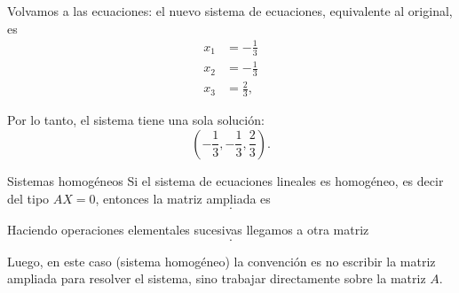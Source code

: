 \documentclass[handout]{beamer} %
\renewcommand{\_}[1]{_{\left[ #1 \right]}}
\renewcommand{\^}[1]{^{\left[ #1 \right]}}
\begin{document}
 	\begin{frame}
 		Volvamos a las ecuaciones: el nuevo sistema de ecuaciones, equivalente al original, es
 		\begin{align*}
 		x_1  &= -\frac{1}{3} \\
 		x_2  &=-\frac{1}{3} \\
 		x_3 &= \frac{2}{3}, 
 		\end{align*}
 		
 		Por lo tanto, el sistema tiene una sola solución:
 		$$
 		( -\frac{1}{3}, -\frac{1}{3} ,\frac{2}{3}).
 		$$

 	\end{frame}
 	

\begin{frame}{Sistemas homogéneos}
 Si el sistema de ecuaciones lineales  es homogéneo, es decir del tipo $AX=0$, entonces la matriz ampliada es 
 \begin{equation*}
 	[A|0].
 \end{equation*}
 
 Haciendo operaciones elementales sucesivas llegamos a otra matriz  
  \begin{equation*}
 [B|0].
 \end{equation*}
 
 Luego,  en este caso (sistema homogéneo) la convención es no escribir la matriz ampliada para resolver el sistema, sino trabajar directamente sobre la matriz $A$. 
 
 
\end{frame}
\end{document}
